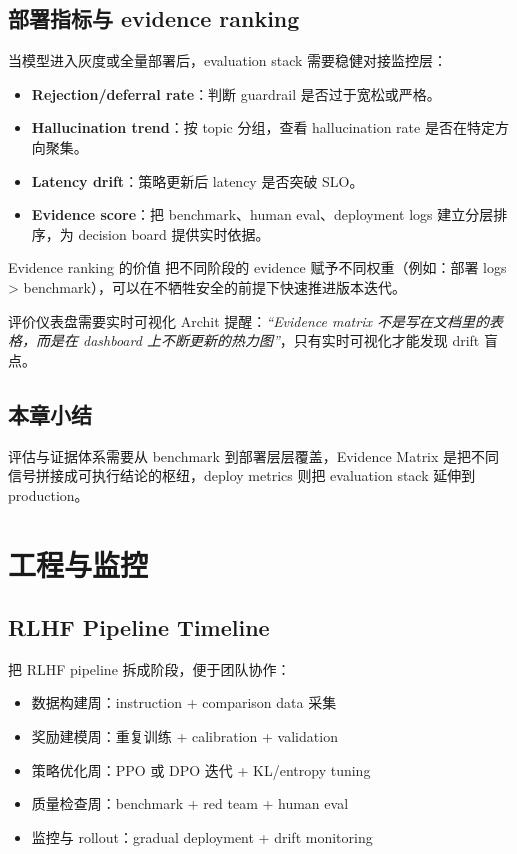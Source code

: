 \documentclass[a4paper]{article}
\begin{document}
\subsection{部署指标与 evidence ranking}

当模型进入灰度或全量部署后，evaluation stack 需要稳健对接监控层：
\begin{itemize}
    \item \textbf{Rejection/deferral rate}：判断 guardrail 是否过于宽松或严格。
    \item \textbf{Hallucination trend}：按 topic 分组，查看 hallucination rate 是否在特定方向聚集。
    \item \textbf{Latency drift}：策略更新后 latency 是否突破 SLO。
    \item \textbf{Evidence score}：把 benchmark、human eval、deployment logs 建立分层排序，为 decision board 提供实时依据。
\end{itemize}

\begin{knowledgebox}{Evidence ranking 的价值}
把不同阶段的 evidence 赋予不同权重（例如：部署 logs > benchmark），可以在不牺牲安全的前提下快速推进版本迭代。
\end{knowledgebox}

\begin{importantbox}{评价仪表盘需要实时可视化}
Archit 提醒：\textit{``Evidence matrix 不是写在文档里的表格，而是在 dashboard 上不断更新的热力图''}，只有实时可视化才能发现 drift 盲点。
\end{importantbox}

\subsection{本章小结}

评估与证据体系需要从 benchmark 到部署层层覆盖，Evidence Matrix 是把不同信号拼接成可执行结论的枢纽，deploy metrics 则把 evaluation stack 延伸到 production。

\section{工程与监控}

\subsection{RLHF Pipeline Timeline}

把 RLHF pipeline 拆成阶段，便于团队协作：

\begin{itemize}
    \item 数据构建周：instruction + comparison data 采集
    \item 奖励建模周：重复训练 + calibration + validation
    \item 策略优化周：PPO 或 DPO 迭代 + KL/entropy tuning
    \item 质量检查周：benchmark + red team + human eval
    \item 监控与 rollout：gradual deployment + drift monitoring
\end{itemize}
\end{document}

